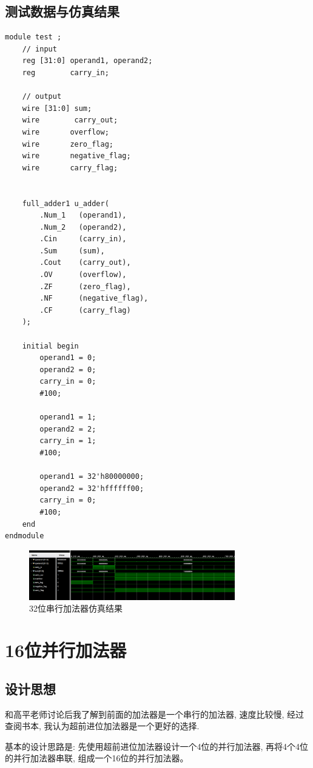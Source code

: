 \documentclass[AutoFakeBold]{LZUThesis}
\begin{document}
\subsection{测试数据与仿真结果}
    \begin{lstlisting}
module test ;
    // input 
    reg [31:0] operand1, operand2;
    reg        carry_in;
    
    // output
    wire [31:0] sum;
    wire        carry_out;
    wire       overflow;
    wire       zero_flag;
    wire       negative_flag;
    wire       carry_flag;


    full_adder1 u_adder(
        .Num_1   (operand1),
        .Num_2   (operand2),
        .Cin     (carry_in),
        .Sum     (sum),
        .Cout    (carry_out),
        .OV      (overflow),
        .ZF      (zero_flag),
        .NF      (negative_flag),
        .CF      (carry_flag)
    );

    initial begin 
        operand1 = 0;
        operand2 = 0;
        carry_in = 0;
        #100;

        operand1 = 1;
        operand2 = 2;
        carry_in = 1;
        #100;

        operand1 = 32'h80000000;
        operand2 = 32'hffffff00;
        carry_in = 0;
        #100;
    end
endmodule
    \end{lstlisting}
    \begin{figure}[htbp]
        \centering
        \includegraphics[width=0.8\textwidth]{./img/32bitadder_simulate}
        \caption{32位串行加法器仿真结果}
        \label{fig:32bitadder_simulate}
    \end{figure}
\section{16位并行加法器}
\subsection{设计思想}
    和高平老师讨论后我了解到前面的加法器是一个串行的加法器, 速度比较慢, 经过查阅书本, 我认为超前进位加法器是一个更好的选择.\par
    基本的设计思路是: 先使用超前进位加法器设计一个4位的并行加法器, 再将4个4位的并行加法器串联, 组成一个16位的并行加法器。
\end{document}

